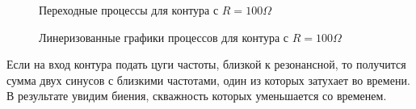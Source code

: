 \documentclass{article}
\begin{document}
\begin{figure}[h]
    \caption{Переходные процессы для контура с $R=100\Omega$}\label{fig:perexod_R_100}
    \newpage
\end{figure}

\begin{figure}[h]
    \caption{Линеризованные графики процессов для контура с $R=100\Omega$}\label{fig:R_100_damp}
    \newpage
\end{figure}

\newpage

Если на вход контура подать цуги частоты, близкой к резонансной, то получится сумма
двух синусов с близкими частотами, один из которых затухает во времени. В результате
увидим биения, скважность которых уменьшается со временем.
\end{document}
